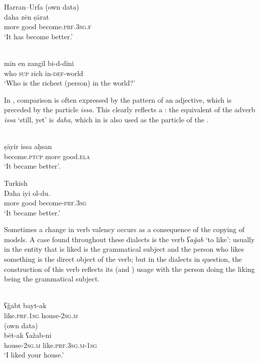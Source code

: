 \documentclass[output=paper]{langsci/langscibook}
\begin{document}
\ea 
{Harran--Urfa (own data)}\\
\gll daha zēn ṣārat\\
     more good become.\textsc{prf.3sg.f}\\
\glt ‘It has become better.’
\z

\ea 
{  \citep[155]{Procházka2002Cukurova}} \\
\gll mīn en zangīl bi-d-dini\\
     who \textsc{sup} rich in-\textsc{def}-world\\
\glt ‘Who is the richest (person) in the world?’ 
\z

In , comparison is often expressed by the  pattern of an adjective, which is preceded by the particle \textit{issa}. This clearly reflects a : the  equivalent of the adverb \textit{issa} ‘still, yet’ is \textit{daha}, which in  is also used as the particle of the . 

\ea 
{  \citep[202]{Procházka2002Cukurova}} \\
\gll ṣāyir issa aḥsan \\
     become.\textsc{ptcp} more good.\textsc{ela}\\
\glt ‘It became better’. 
\z

\ea 
{Turkish}\\
\gll Daha iyi ol-du.\\
     more good become-\textsc{prf.3sg}\\
\glt ‘It became better.’
\z

Sometimes a change in verb valency occurs as a consequence of the copying of  models. A case found throughout these dialects is the verb \textit{ʕaǧab} ‘to like’: usually in  the entity that is liked is the grammatical subject and the person who likes something is the direct object of the verb; but in the  dialects in question, the construction of this verb reflects its  (and ) usage with the person doing the liking being the grammatical subject.

\ea 
\ea {} \citep[200]{Procházka2002Cukurova}\\
   \gll ʕǧabt bayt-ak\\
     like.\textsc{prf.1sg} house-\textsc{2sg.m}\\
\ex
  (own data)\\
   \gll bēt-ak ʕažab-ni\\
     house-\textsc{2sg.m} like.\textsc{prf.3sg.m-1sg}\\
\glt ‘I liked your house.’
\z
\z
\end{document}
